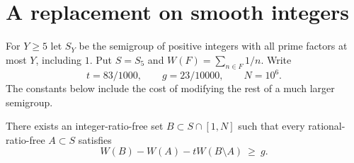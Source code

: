 \documentclass[11pt]{article}
\begin{document}
\section{A replacement on smooth integers}
For $Y\ge5$ let $S_Y$ be the semigroup of positive integers with all prime factors at most $Y$, including $1$. Put $S=S_5$ and $W(F)=\sum_{n\in F}1/n$. Write
\[
              t=83/1000,\qquad g=23/10000,\qquad N=10^6.
\]
The constants below include the cost of modifying the rest of a much larger semigroup.
\begin{lemma}\label{l:exchange}
There exists an integer-ratio-free set $B\subset S\cap[1,N]$ such that every rational-ratio-free $A\subset S$ satisfies
\begin{equation}
       W(B)-W(A)-tW(B\setminus A)\ \ge\ g. \label{eq:exchange}
\end{equation}
\end{lemma}
\end{document}
